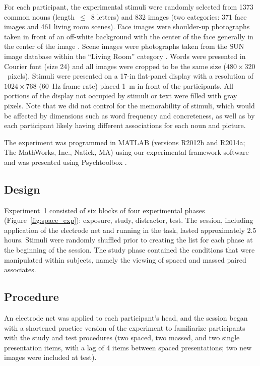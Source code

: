 For each participant, the experimental stimuli were randomly selected from 1373 common nouns (length~$\leq$~8 letters) \cite{PEERSwordpool}
and 832 images (two categories: 371 face images and 461 living room scenes).  Face images were shoulder-up photographs taken in front of an off-white background with the center of the face generally in the center of the image \cite{PhilEtal2000}.  Scene images were photographs taken from the SUN image database within the ``Living Room'' category \cite{XiaoEtal2010}.  Words were presented in Courier font (size 24) and all images were cropped to be the same size ($480\times320$~pixels).  Stimuli were presented on a 17-in flat-panel display with a resolution of $1024\times768$ (60~Hz frame rate) placed 1~m in front of the participants.  All portions of the display not occupied by stimuli or text were filled with gray pixels.  Note that we did not control for the memorability of stimuli, which would be affected by dimensions such as word frequency and concreteness, as well as by each participant likely having different associations for each noun and picture.


The experiment was programmed in MATLAB (versions R2012b and R2014a; The MathWorks, Inc., Natick, MA) using our experimental framework software \cite{expertTrain}
and was presented using Psychtoolbox \cite{Brai1997}.

\subsection{Design}

Experiment~1 consisted of six blocks of four experimental phases (Figure~\ref{fig:space_exp}): exposure, study, distractor, test.  The session, including application of the electrode net and running in the task, lasted approximately 2.5 hours.  Stimuli were randomly shuffled prior to creating the list for each phase at the beginning of the session.  The study phase contained the conditions that were manipulated within subjects, namely the viewing of spaced and massed paired associates.

\subsection{Procedure}

An electrode net was applied to each participant's head, and the session began with a shortened practice version of the experiment to familiarize participants with the study and test procedures (two spaced, two massed, and two single presentation items, with a lag of 4 items between spaced presentations; two new images were included at test).

